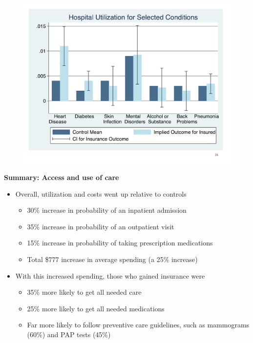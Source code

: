 \documentclass[notes=show]{beamer}
\begin{document}
\begin{frame}[plain]
	
	\begin{figure}
	\includegraphics[scale=0.40]{./lecture_includes/baicker_7.pdf}
	\end{figure}
\end{frame}


\begin{frame}[plain]
	\begin{center}
	\textbf{Summary: Access and use of care}
	\end{center}
	
	\begin{itemize}
	\item Overall, utilization and costs went up relative to controls
		\begin{itemize}
		\item 30\% increase in probability of an inpatient admission
		\item 35\% increase in probability of an outpatient visit
		\item 15\% increase in probability of taking prescription medications
		\item Total \$777 increase in average spending (a 25\% increase)
		\end{itemize}
	\item With this increased spending, those who gained insurance were
		\begin{itemize}
		\item 35\% more likely to get all needed care
		\item 25\% more likely to get all needed medications
		\item Far more likely to follow preventive care guidelines, such as mammograms (60\%) and PAP tests (45\%)
		\end{itemize}
	\end{itemize}
\end{frame}
\end{document}
